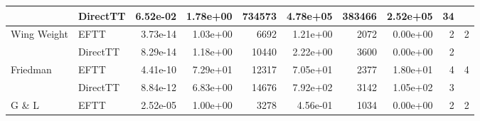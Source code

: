 \begin{table}[!ht]
{\begin{tabular}{llrrrrrrrr}
                                   & DirectTT                        & 6.52e-02                    & 1.78e+00                                           & 734573                         & 4.78e+05                                            & 383466                        & 2.52e+05                                         & 34                                       &                                          \\ \hline
    \multirow{2}{*}{Wing Weight}   & EFTT                            & 3.73e-14                    & 1.03e+00                                           & 6692                           & 1.21e+00                                            & 2072                          & 0.00e+00                                         & 2                                        & 2                                        \\ %
                                   & DirectTT                        & 8.29e-14                    & 1.18e+00                                           & 10440                          & 2.22e+00                                            & 3600                          & 0.00e+00                                         & 2                                        &                                          \\ \hline
    \multirow{2}{*}{Friedman}      & EFTT                            & 4.41e-10                    & 7.29e+01                                           & 12317                          & 7.05e+01                                            & 2377                          & 1.80e+01                                         & 4                                        & 4                                        \\ %
                                   & DirectTT                        & 8.84e-12                    & 6.83e+00                                           & 14676                          & 7.92e+02                                            & 3142                          & 1.05e+02                                         & 3                                        &                                          \\ \hline
    \multirow{2}{*}{G \& L}        & EFTT                            & 2.52e-05                    & 1.00e+00                                           & 3278                           & 4.56e-01                                            & 1034                          & 0.00e+00                                         & 2                                        & 2                                        \\ %

\end{tabular}}
\end{table}
